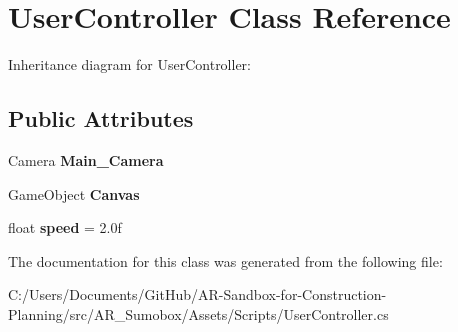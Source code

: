 \hypertarget{class_user_controller}{}\section{User\+Controller Class Reference}
\label{class_user_controller}
Inheritance diagram for User\+Controller\+:\begin{figure}[H]
\begin{center}
\leavevmode
\end{center}
\end{figure}
\subsection*{Public Attributes}
\begin{DoxyCompactItemize}
\item 
\mbox{\label{class_user_controller_a154397b4fa32f210f7c3a4f522e675a3}} 
Camera {\bfseries Main\+\_\+\+Camera}
\item 
\mbox{\label{class_user_controller_aba96ac433b3eeabe947cc96102a89bb6}} 
Game\+Object {\bfseries Canvas}
\item 
\mbox{\label{class_user_controller_a1fbf0acd74af79aee3ba6928fed0f18a}} 
float {\bfseries speed} = 2.\+0f
\end{DoxyCompactItemize}


The documentation for this class was generated from the following file\+:\begin{DoxyCompactItemize}
\item 
C\+:/\+Users/\+Documents/\+Git\+Hub/\+A\+R-\/\+Sandbox-\/for-\/\+Construction-\/\+Planning/src/\+A\+R\+\_\+\+Sumobox/\+Assets/\+Scripts/User\+Controller.\+cs\end{DoxyCompactItemize}
